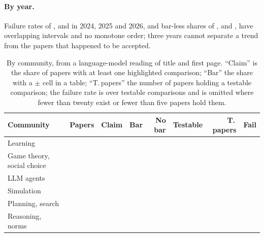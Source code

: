 \documentclass[sigconf,anonymous]{aamas}
\begin{document}
\paragraph{By year.} Failure rates of \nAFailTwentyFourCi{},
\nAFailTwentyFiveCi{} and \nAFailTwentySixCi{} in 2024, 2025 and 2026,
and bar-less shares of \nANeitherTwentyFour{}, \nANeitherTwentyFive{} and
\nANeitherTwentySix{}, have overlapping intervals and no monotone order;
three years cannot separate a trend from the papers that happened to be
accepted.

\begin{table}[t]
\caption{By community, from a language-model reading of title and first page.
``Claim'' is the share of papers with at least one highlighted comparison;
``Bar'' the share with a $\pm$ cell in a table; ``T.\,papers'' the number of
papers holding a testable comparison; the failure rate is over testable
comparisons and is omitted where fewer than twenty exist or fewer than five
papers hold them.}
\label{tab:community}
\footnotesize
\setlength{\tabcolsep}{2.6pt}
\begin{tabular}{@{}lrrrrrrr@{}}
\toprule
Community & Papers & Claim & Bar & No bar & Testable & T.\,papers & Fail \\
\midrule
Learning & \nCLearningPapers{} & \nCLearningClaimPapers{} & \nCLearningPapersErr{} & \nCLearningNeither{} & \nCLearningTestable{} & \nCLearningTestablePapers{} & \nCLearningFail{} \\
Game theory, social choice & \nCGameTheorySocialChoicePapers{} & \nCGameTheorySocialChoiceClaimPapers{} & \nCGameTheorySocialChoicePapersErr{} & \nCGameTheorySocialChoiceNeither{} & \nCGameTheorySocialChoiceTestable{} & \nCGameTheorySocialChoiceTestablePapers{} & \nCGameTheorySocialChoiceFail{} \\
LLM agents & \nCLlmAgentsPapers{} & \nCLlmAgentsClaimPapers{} & \nCLlmAgentsPapersErr{} & \nCLlmAgentsNeither{} & \nCLlmAgentsTestable{} & \nCLlmAgentsTestablePapers{} & \nCLlmAgentsFail{} \\
Simulation & \nCSimulationPapers{} & \nCSimulationClaimPapers{} & \nCSimulationPapersErr{} & \nCSimulationNeither{} & \nCSimulationTestable{} & \nCSimulationTestablePapers{} & \nCSimulationFail{} \\
Planning, search & \nCPlanningSearchPapers{} & \nCPlanningSearchClaimPapers{} & \nCPlanningSearchPapersErr{} & \nCPlanningSearchNeither{} & \nCPlanningSearchTestable{} & \nCPlanningSearchTestablePapers{} & \nCPlanningSearchFail{} \\
Reasoning, norms & \nCReasoningNormsPapers{} & \nCReasoningNormsClaimPapers{} & \nCReasoningNormsPapersErr{} & \nCReasoningNormsNeither{} & \nCReasoningNormsTestable{} & \nCReasoningNormsTestablePapers{} & \nCReasoningNormsFail{} \\

\end{tabular}
\end{table}
\end{document}
